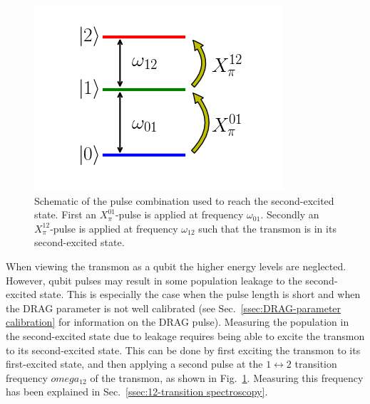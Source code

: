         \begin{figure}
          \begin{center}
          \vspace{-30pt}
            \includegraphics[width=\textwidth]{Figures/Exploring frequency reuse/schematic second transition pulsing.png}
          \end{center}
          \vspace{-20 pt}
          \caption{Schematic of the pulse combination used to reach the second-excited state. First an $X_\pi^{01}$-pulse is applied at frequency $\omega_{01}$. Secondly an $X_\pi^{12}$-pulse is applied at frequency $\omega_{12}$ such that the transmon is in its second-excited state.}
          \label{fig:schematic pulsing to second-excited state}
        \end{figure}

        When viewing the transmon as a qubit the higher energy levels are neglected. However, qubit pulses may result in some population leakage to the second-excited state. This is especially the case when the pulse length is short and when the DRAG parameter is not well calibrated (see Sec.~\ref{ssec:DRAG-parameter calibration} for information on the DRAG pulse). Measuring the population in the second-excited state due to leakage requires being able to excite the transmon to its second-excited state. This can be done by first exciting the transmon to its first-excited state, and then applying a second pulse at the $1 \leftrightarrow 2$ transition frequency $omega_{12}$ of the transmon, as shown in Fig.~\ref{fig:schematic pulsing to second-excited state}. Measuring this frequency has been explained in Sec.~\ref{ssec:12-transition spectroscopy}.

